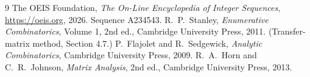 \documentclass[11pt,a4paper]{article}
\theoremstyle{plain}
\theoremstyle{definition}
\begin{document}
\begin{thebibliography}{9}
 The OEIS Foundation, \emph{The On-Line Encyclopedia of Integer
Sequences}, \url{https://oeis.org}, 2026. Sequence A234543.
 R.~P.~Stanley, \emph{Enumerative Combinatorics}, Volume 1, 2nd ed.,
Cambridge University Press, 2011. (Transfer-matrix method, Section 4.7.)
 P.~Flajolet and R.~Sedgewick, \emph{Analytic Combinatorics}, Cambridge
University Press, 2009.
 R.~A.~Horn and C.~R.~Johnson, \emph{Matrix Analysis}, 2nd ed., Cambridge
University Press, 2013.
\end{thebibliography}
\end{document}

